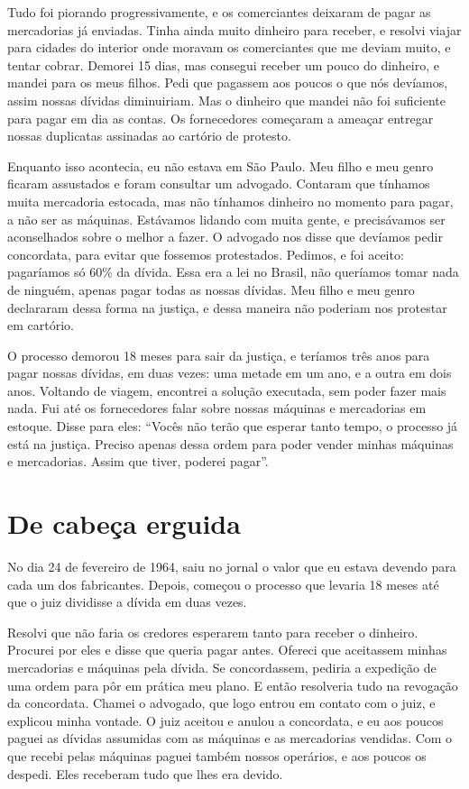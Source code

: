 Tudo foi piorando progressivamente, e os comerciantes deixaram de pagar as
mercadorias já enviadas. Tinha ainda muito dinheiro para
receber, e resolvi viajar para cidades do interior onde moravam os comerciantes que me
deviam muito, e tentar cobrar. Demorei 15 dias, mas consegui receber
um pouco do dinheiro, e mandei para os meus filhos. Pedi que pagassem aos poucos o que nós devíamos, assim nossas dívidas
diminuiriam. Mas o dinheiro que mandei não foi suficiente para pagar em dia
as contas. Os fornecedores começaram a ameaçar entregar
nossas duplicatas assinadas ao cartório de protesto.

Enquanto isso acontecia, eu não estava em São Paulo. Meu filho e meu
genro ficaram assustados e foram consultar um advogado. Contaram que tínhamos muita mercadoria estocada,
mas não tínhamos dinheiro no momento para pagar, a não ser as
máquinas. Estávamos lidando com muita gente, e precisávamos ser aconselhados 
sobre o melhor a fazer. O advogado nos disse que
devíamos pedir concordata, para evitar que fossemos protestados. Pedimos, e foi aceito: pagaríamos só 60\% da dívida. Essa era a lei no Brasil, não queríamos tomar
nada de ninguém, apenas pagar todas as nossas dívidas. Meu filho e
meu genro declararam dessa forma na justiça, e dessa maneira não poderiam nos
protestar em cartório.

O processo demorou 18 meses para sair da justiça, e teríamos
três anos para pagar nossas dívidas, em duas vezes: uma metade em um ano, e a
outra em dois anos. Voltando de viagem, encontrei a solução executada, sem poder fazer mais nada. Fui até os fornecedores falar sobre nossas
máquinas e mercadorias em estoque. Disse para eles: ``Vocês não 
terão que esperar tanto tempo, o processo já está na justiça. Preciso apenas dessa ordem para poder vender minhas máquinas e mercadorias. Assim que tiver, 
poderei pagar''.

\chapter{De cabeça erguida}

No dia 24 de fevereiro de 1964, saiu no jornal o valor que eu estava
devendo para cada um dos fabricantes. Depois, começou o processo que 
levaria 18 meses até que o juiz dividisse a dívida em duas vezes.

Resolvi que não faria os credores esperarem tanto para receber
o dinheiro. Procurei por eles e disse que queria pagar antes. Ofereci que
aceitassem minhas mercadorias e máquinas pela dívida. Se concordassem, pediria a expedição de uma ordem para pôr em prática meu plano. E então resolveria tudo na revogação da
concordata. Chamei o advogado, que logo entrou em contato com o juiz, e explicou minha vontade. O juiz aceitou e anulou a concordata, e eu aos
poucos paguei as dívidas assumidas com as máquinas e as mercadorias vendidas.
Com o que recebi pelas máquinas paguei também nossos operários, e aos
poucos os despedi. Eles receberam tudo que lhes era devido. 

